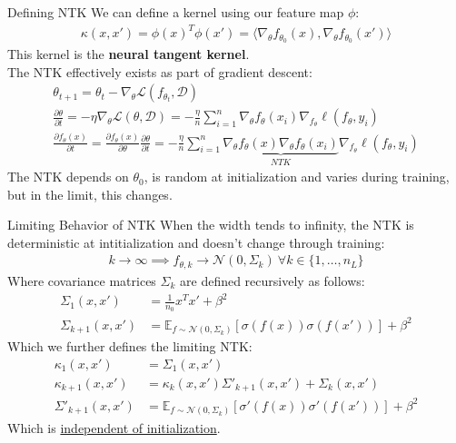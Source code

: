 \documentclass{beamer}
\begin{document}
\begin{frame}{Defining NTK}
	We can define a kernel using our feature map $\phi$:
	\begin{gather}
		\kappa(x, x') = \phi(x)^T \phi(x') = \langle \nabla_\theta f_{\theta_0}(x), \nabla_\theta f_{\theta_0}(x') \rangle
	\end{gather}
	This kernel is the \textbf{neural tangent kernel}. \pause \newline \\

	The NTK effectively exists as part of gradient descent:
	\begin{gather}
		\theta_{t+1} = \theta_t - \nabla_\theta \mathcal{L}(f_{\theta_t}, \mathcal{D}) \\
		\frac{\partial \theta}{\partial t} = - \eta \nabla_\theta \mathcal{L}(\theta, \mathcal{D}) = - \frac{\eta}{n} \sum^n_{i=1} \nabla_\theta f_\theta(x_i) \nabla_{f_\theta} \ell(f_\theta, y_i) \\
		\frac{\partial f_\theta(x)}{\partial t} = \frac{\partial f_\theta(x)}{\partial \theta} \frac{\partial \theta}{\partial t} = - \frac{\eta}{n} \sum^n_{i=1} \underbrace{\nabla_\theta f_\theta(x) \nabla_\theta f_\theta(x_i)}_{NTK} \nabla_{f_\theta} \ell(f_\theta, y_i)
	\end{gather} \pause
	The NTK depends on $\theta_0$, is random at initialization and varies during training, but in the limit, this changes.
\end{frame}

\begin{frame}{Limiting Behavior of NTK}
	When the width tends to infinity, the NTK is deterministic at intitialization and doesn't change through training:
	\begin{gather}
		k \rightarrow \infty \implies f_{\theta,k} \rightarrow \mathcal{N}(0, \Sigma_k)~\forall k \in \{1, \ldots, n_L\}
	\end{gather} \pause
	Where covariance matrices $\Sigma_k$ are defined recursively as follows:
	\begin{align}
		\Sigma_1(x, x') &= \frac{1}{n_0} x^T x' + \beta^2 \\
		\Sigma_{k+1}(x, x') &= \mathbb{E}_{f \sim \mathcal{N}(0, \Sigma_k)}[\sigma(f(x)) \sigma(f(x'))] + \beta^2
	\end{align} \pause
	Which we further defines the limiting NTK:
	\begin{align}
		\kappa_1(x, x') &= \Sigma_1(x, x') \\
		\kappa_{k+1}(x, x') &= \kappa_{k}(x, x') \Sigma'_{k+1}(x, x') + \Sigma_k(x, x') \\
		\Sigma'_{k+1}(x, x') &= \mathbb{E}_{f \sim \mathcal{N}(0, \Sigma_k)}[\sigma'(f(x)) \sigma'(f(x'))] + \beta^2
	\end{align}
	Which is \underline{independent of initialization}.
\end{frame}
\end{document}
